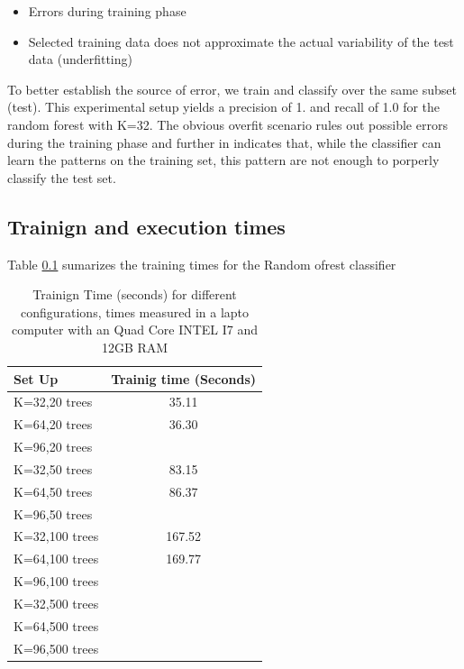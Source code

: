 \documentclass[a4paper]{article}
\begin{document}
\begin{itemize}
	\item Errors during training phase
	\item Selected training data does not approximate the actual variability of the test data (underfitting)
\end{itemize}

To better establish the source of error, we train and classify over the same subset (test). This experimental setup yields a precision of 1. and recall of 1.0 for the random forest with K=32. The obvious overfit scenario rules out possible errors during the training phase and further in indicates that, while the classifier can learn the patterns on the training set, this pattern are not enough to porperly classify the test set.

\subsection{Trainign and execution times}
Table \ref{} sumarizes the training times for the Random ofrest classifier

\begin{table}[t]
\centering
\begin{tabular}{ l | c }
Set Up & Trainig time (Seconds)    \\
\hline	
K=32,20 trees & 35.11 \\
K=64,20 trees &   36.30 \\
K=96,20 trees &    \\
K=32,50 trees & 83.15  \\
K=64,50 trees &  86.37 \\
K=96,50 trees &   \\
K=32,100 trees &  167.52 \\
K=64,100 trees &  169.77  \\
K=96,100 trees &  \\
K=32,500 trees &   \\
K=64,500 trees &   \\
K=96,500 trees &   \\

\end{tabular}
\caption{Trainign Time (seconds) for different configurations, times measured in a lapto computer with an Quad Core INTEL I7 and 12GB RAM}
\label{table:table2}
\end{table}
\end{document}
